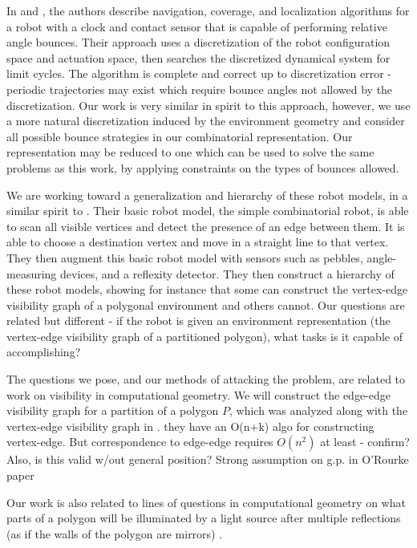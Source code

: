 \documentclass[]{styles/svproc}  %
\begin{document}
In \cite{alam2017minimalist} and \cite{alam2018space}, the authors describe
navigation, coverage, and localization algorithms for a robot with a clock and
contact sensor that is capable of performing relative angle bounces. Their
approach uses a discretization of the robot configuration space and actuation
space, then searches the discretized dynamical system for limit cycles. The
algorithm is complete and correct up to discretization error - periodic
trajectories may exist which require bounce angles not allowed by the
discretization. Our work is very similar in spirit to this approach, however, we
use a more natural discretization induced by the environment geometry and
consider all possible bounce strategies in our combinatorial representation. Our
representation may be reduced to one which can be used to solve the same
problems as this work, by applying constraints on the types of bounces allowed.

We are working toward a generalization and hierarchy of these robot models, in a
similar spirit to \cite{brunner2008simple}. Their basic robot model, the simple
combinatorial robot, is able to scan all visible vertices and detect the
presence of an edge between them. It is able to choose a destination vertex and
move in a straight line to that vertex. They then augment this basic robot model
with sensors such as pebbles, angle-measuring devices, and a reflexity detector.
They then construct a hierarchy of these robot models, showing for instance that
some can construct the vertex-edge visibility graph of a polygonal environment
and others cannot. Our questions are related but different - if the robot is
given an environment representation (the vertex-edge visibility graph of a
partitioned polygon), what tasks is it capable of accomplishing?

The questions we pose, and our methods of attacking the problem, are related to
work on visibility in computational geometry. We will construct the edge-edge 
visibility graph for a partition of a polygon $P$, which was analyzed along with
the vertex-edge visibility graph in \cite{rourke_viz}.
{\color{red} they have an
O(n+k) algo for constructing vertex-edge. But correspondence to edge-edge 
requires $O(n^2)$ at least - confirm? Also, is this valid w/out general position?
Strong assumption on g.p. in O'Rourke paper}

Our work is also related to lines of questions in computational geometry on what
parts of a polygon will be illuminated by a light source after multiple
reflections (as if the walls of the polygon are mirrors) \cite{Aronov1996,
prasad1998visibility}.
\end{document}
